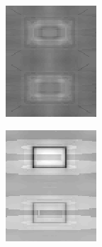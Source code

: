 \documentclass[journal,onecolumn]{IEEEtran}
\begin{document}
{\begin{figure}[H]
\begin{subfigure}[b]{0.2\textwidth}
            \includegraphics[width=.85\linewidth, frame]{test-crisp-opp-1-ld}
            \caption{}
            \label{fig:test-crisp-opp-1-ld}
    \end{subfigure}%
    \begin{subfigure}[b]{0.2\textwidth}
            \centering
            \includegraphics[width=.85\linewidth, frame]{test-crisp-opp-2-ld}

\end{subfigure}
\end{figure}}
\end{document}
